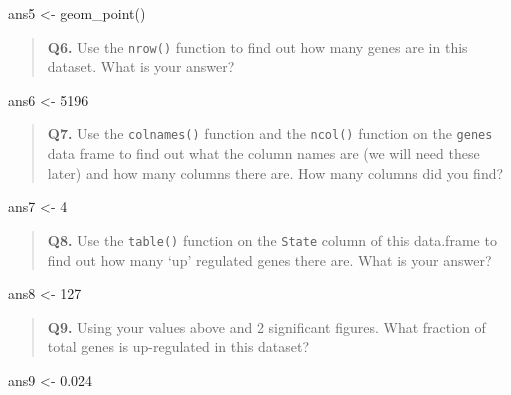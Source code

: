 \documentclass[
  letterpaper,
  DIV=11,
  numbers=noendperiod]{scrartcl}
\newenvironment{Shaded}{\begin{snugshade}}{\end{snugshade}}
\newcommand{\DecValTok}[1]{\textcolor[rgb]{0.68,0.00,0.00}{#1}}
\newcommand{\FloatTok}[1]{\textcolor[rgb]{0.68,0.00,0.00}{#1}}
\newcommand{\FunctionTok}[1]{\textcolor[rgb]{0.28,0.35,0.67}{#1}}
\newcommand{\NormalTok}[1]{\textcolor[rgb]{0.00,0.23,0.31}{#1}}
\newcommand{\OtherTok}[1]{\textcolor[rgb]{0.00,0.23,0.31}{#1}}
\begin{document}
\begin{Shaded}
\begin{Highlighting}[]
\NormalTok{ans5 }\OtherTok{\textless{}{-}} \FunctionTok{geom\_point}\NormalTok{()}
\end{Highlighting}
\end{Shaded}

\begin{quote}
\textbf{Q6.} Use the \texttt{nrow()} function to find out how many genes
are in this dataset. What is your answer?
\end{quote}

\begin{Shaded}
\begin{Highlighting}[]
\NormalTok{ans6 }\OtherTok{\textless{}{-}} \DecValTok{5196}
\end{Highlighting}
\end{Shaded}

\begin{quote}
\textbf{Q7.} Use the \texttt{colnames()} function and the
\texttt{ncol()} function on the \texttt{genes} data frame to find out
what the column names are (we will need these later) and how many
columns there are. How many columns did you find?
\end{quote}

\begin{Shaded}
\begin{Highlighting}[]
\NormalTok{ans7 }\OtherTok{\textless{}{-}} \DecValTok{4}
\end{Highlighting}
\end{Shaded}

\begin{quote}
\textbf{Q8.} Use the \texttt{table()} function on the \texttt{State}
column of this data.frame to find out how many `up' regulated genes
there are. What is your answer?
\end{quote}

\begin{Shaded}
\begin{Highlighting}[]
\NormalTok{ans8 }\OtherTok{\textless{}{-}} \DecValTok{127}
\end{Highlighting}
\end{Shaded}

\begin{quote}
\textbf{Q9.} Using your values above and 2 significant figures. What
fraction of total genes is up-regulated in this dataset?
\end{quote}

\begin{Shaded}
\begin{Highlighting}[]
\NormalTok{ans9 }\OtherTok{\textless{}{-}} \FloatTok{0.024}
\end{Highlighting}
\end{Shaded}
\end{document}
